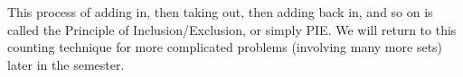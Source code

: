 \documentclass[12pt]{article}
\begin{document}
This process of adding in, then taking out, then adding back in, and so on is called the Principle of Inclusion/Exclusion, or simply PIE.  We will return to this counting technique for more complicated problems (involving many more sets) later in the semester.


% 
% 
% 
% 
\end{document}
